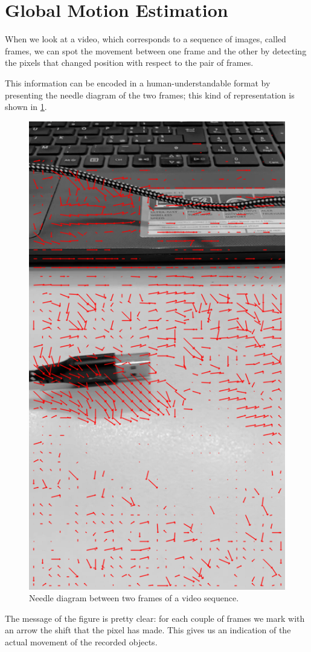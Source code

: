 \section{Global Motion Estimation}
\label{sec:02-gme}
When we look at a video, which corresponds to a sequence of images, called frames, we can spot the movement between one frame and the other by detecting the pixels that changed position with respect to the pair of frames.

This information can be encoded in a human-understandable format by presenting the needle diagram of the two frames; this kind of representation is shown in \cref{fig:needle-diagram}. 

\begin{figure}
    \centering
    \includegraphics[width=.7\linewidth]{../assets/images/bbme-0-res.png}
    \caption{Needle diagram between two frames of a video sequence.}
    \label{fig:needle-diagram}
\end{figure}

The message of the figure is pretty clear: for each couple of frames we mark with an arrow the shift that the pixel has made. This gives us an indication of the actual movement of the recorded objects.

